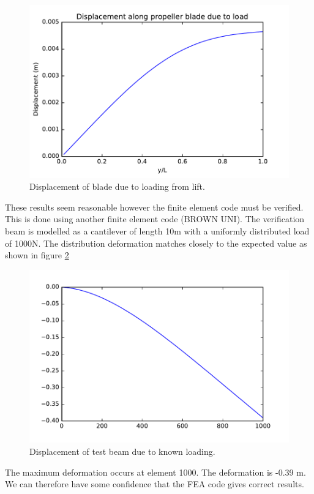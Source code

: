 \documentclass[]{report}
\begin{document}
\begin{figure}
	\centering
	\includegraphics[scale=0.5]{displacement_zero_camber.pdf}
	\caption{Displacement of blade due to loading from lift.}
	\label{fig:displacement zero camber}
\end{figure}
These results seem reasonable however the finite element code must be verified. This is done using another finite element code (BROWN UNI). The verification beam is modelled as a cantilever of length 10m with a uniformly distributed load of 1000N. The distribution deformation matches closely to the expected value as shown in figure \ref{fig:deformation test}
\begin{figure}
	\centering
	\includegraphics[scale=0.5]{timo_test.pdf}
	\caption{Displacement of test beam due to known loading.}
	\label{fig:deformation test}
\end{figure}

The maximum deformation occurs at element 1000. The deformation is -0.39 m. We can therefore have some confidence that the FEA code gives correct results.
\end{document}
